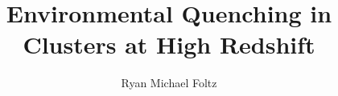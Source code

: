 \documentclass[oneside,final,letterpaper,10pt]{ucr}
\def\dsp{\def\baselinestretch{2.0}\large\normalsize} \dsp
\begin{document}
\title{Environmental Quenching in Clusters at High Redshift}
\author{Ryan Michael Foltz}

\maketitle
\copyrightpage{}
\approvalpage{}


\begin{frontmatter}







\tableofcontents
\newpage
\listoffigures
\newpage
\listoftables
\end{frontmatter}









\newpage


\newcommand\newblock{\hskip .11em\@plus.33em\@minus.07em}

\def\dsp{\def\baselinestretch{1.0}\large\normalsize} \dsp


\end{document}
